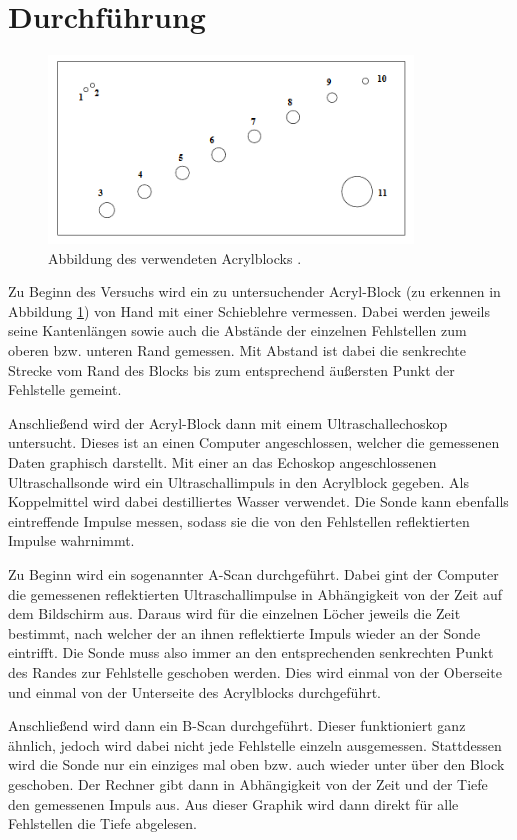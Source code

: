 \section{Durchführung}
\label{sec:Durchführung}
\begin{figure}[H]
  \centering
  \includegraphics[height=5cm]{acryl.PNG}
  \caption{Abbildung des verwendeten Acrylblocks \cite{sample}.}
  \label{fig:acryl}
\end{figure}
Zu Beginn des Versuchs wird ein zu untersuchender Acryl-Block (zu erkennen in Abbildung \ref{fig:acryl})
von Hand mit einer Schieblehre vermessen. Dabei werden jeweils seine Kantenlängen sowie auch die
Abstände der einzelnen Fehlstellen zum oberen bzw. unteren Rand gemessen. Mit Abstand ist dabei die
senkrechte Strecke vom Rand des Blocks bis zum entsprechend äußersten Punkt der Fehlstelle gemeint.

Anschließend wird der Acryl-Block dann mit einem Ultraschallechoskop untersucht. Dieses ist an
einen Computer angeschlossen, welcher die gemessenen Daten graphisch darstellt.
Mit einer an das Echoskop angeschlossenen Ultraschallsonde wird ein Ultraschallimpuls
in den Acrylblock gegeben. Als Koppelmittel wird dabei destilliertes Wasser verwendet. Die Sonde
kann ebenfalls eintreffende Impulse messen, sodass sie die von den Fehlstellen reflektierten
Impulse wahrnimmt.

Zu Beginn wird ein sogenannter A-Scan durchgeführt. Dabei gint der Computer die gemessenen
reflektierten Ultraschallimpulse in Abhängigkeit von der Zeit auf dem Bildschirm aus.
Daraus wird für die einzelnen Löcher jeweils die Zeit bestimmt, nach welcher der an ihnen
reflektierte Impuls wieder an der Sonde eintrifft. Die Sonde muss also immer an den entsprechenden senkrechten
Punkt des Randes zur Fehlstelle geschoben werden. Dies wird einmal von der Oberseite und einmal
von der Unterseite des Acrylblocks durchgeführt.

Anschließend wird dann ein B-Scan durchgeführt. Dieser funktioniert ganz ähnlich, jedoch wird
dabei nicht jede Fehlstelle einzeln ausgemessen. Stattdessen wird die Sonde nur ein einziges mal oben bzw. auch wieder
unter über den Block geschoben. Der Rechner gibt dann in Abhängigkeit von der Zeit und der Tiefe den gemessenen
Impuls aus. Aus dieser Graphik wird dann direkt für alle Fehlstellen die Tiefe abgelesen.

